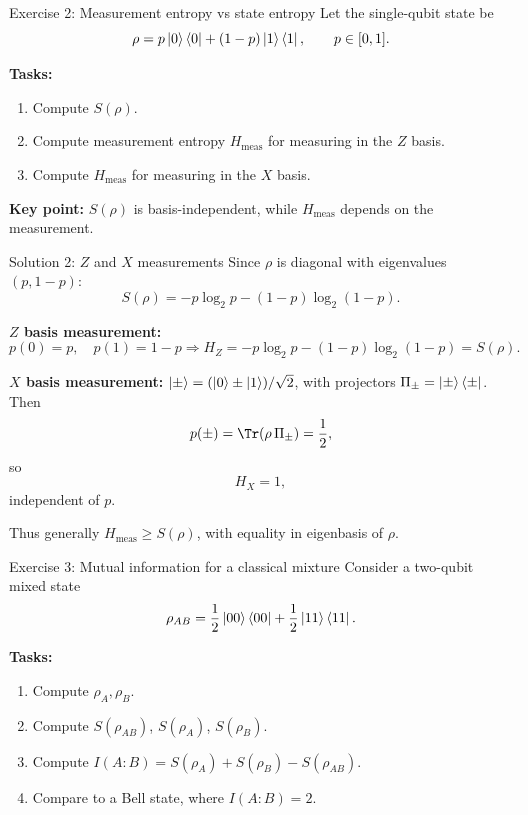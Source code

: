 \documentclass[aspectratio=169]{beamer}
\begin{document}
\begin{frame}{Exercise 2: Measurement entropy vs state entropy}
Let the single-qubit state be
\[
\rho = p\ket{0}\bra{0}+(1-p)\ket{1}\bra{1},\qquad p\in[0,1].
\]

\textbf{Tasks:}
\begin{enumerate}
\item Compute $S(\rho)$.
\item Compute measurement entropy $H_{\text{meas}}$ for measuring in the $Z$ basis.
\item Compute $H_{\text{meas}}$ for measuring in the $X$ basis.
\end{enumerate}

\medskip
\textbf{Key point:} $S(\rho)$ is basis-independent, while $H_{\text{meas}}$ depends on the measurement.
\end{frame}

\begin{frame}{Solution 2: $Z$ and $X$ measurements}
Since $\rho$ is diagonal with eigenvalues $(p,1-p)$:
\[
S(\rho)=-p\log_2 p-(1-p)\log_2(1-p).
\]

\medskip
\textbf{$Z$ basis measurement:}
\[
p(0)=p,\quad p(1)=1-p
\Rightarrow
H_Z=-p\log_2 p-(1-p)\log_2(1-p)=S(\rho).
\]

\medskip
\textbf{$X$ basis measurement:}
$\ket{\pm}=(\ket{0}\pm\ket{1})/\sqrt{2}$, with projectors $\Pi_\pm=\ket{\pm}\bra{\pm}$.
Then
\[
p(\pm)=\Tr(\rho\,\Pi_\pm)=\frac{1}{2},
\]
so
\[
H_X=1,
\]
independent of $p$.

\medskip
Thus generally $H_{\text{meas}}\ge S(\rho)$, with equality in eigenbasis of $\rho$.
\end{frame}

\begin{frame}{Exercise 3: Mutual information for a classical mixture}
Consider a two-qubit mixed state
\[
\rho_{AB}= \frac{1}{2}\ket{00}\bra{00}+\frac{1}{2}\ket{11}\bra{11}.
\]

\textbf{Tasks:}
\begin{enumerate}
\item Compute $\rho_A,\rho_B$.
\item Compute $S(\rho_{AB})$, $S(\rho_A)$, $S(\rho_B)$.
\item Compute $I(A\!:\!B)=S(\rho_A)+S(\rho_B)-S(\rho_{AB})$.
\item Compare to a Bell state, where $I(A\!:\!B)=2$.
\end{enumerate}
\end{frame}
\end{document}
